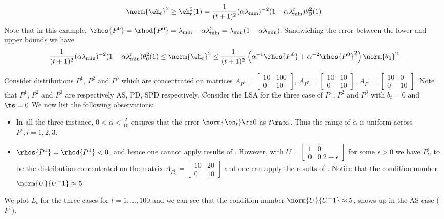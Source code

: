 \begin{align*}
\norm{\eh_t}^2\geq \eh^2_t(1)=\frac{1}{(t+1)^2}(\alpha \lambda_{\min})^{-2}(1-\alpha \lambda_{\min}^t) \theta^2_0(1)
\end{align*}
Note that in this example, $\rhos{P^0}=\rhod{P^0}=\lambda_{\min} -\alpha \lambda_{\min}^2=\lambda_{\min}(1-\alpha \lambda_{\min})$. Sandwiching the error between the lower and upper bounds we have
\begin{align}
\frac{1}{(t+1)^2}(\alpha \lambda_{\min})^{-2}(1-\alpha \lambda_{\min}^t) \theta^2_0(1)\leq \norm{\eh_t}^2\leq
\frac{1}{(t+1)^2} \left(\alpha^{-1}\rhos{P^0}+\alpha^{-2}\rhos{P^0}^2\right)\norm{\theta_0}^2
\end{align}
\begin{example}
Consider distributions $P^1$, $P^2$ and $P^3$ which are concentrated on matrices $A_{P^1}=\begin{bmatrix} 10 &100\\ 0 &10\end{bmatrix}$, $A_{P^2}=\begin{bmatrix} 10 &10\\ 0 &10\end{bmatrix}$, $A_{P^3}=\begin{bmatrix} 10 &0 \\ 0 &10\end{bmatrix}$. Note that $P^1$, $P^2$ and $P^3$ are respectively AS, PD, SPD respectively. Consider the LSA for the three case of $P^1$, $P^2$ and $P^3$ with $b_t=0$ and $\ts=0$
We now list the following observations:
\begin{itemize}[leftmargin=*, before = \leavevmode\vspace{-\baselineskip}]
\item In all the three instance, $0<\alpha<\frac2{10}$ ensures that the error $\norm{\eh_t}\ra 0$ as $t\ra\infty$. Thus the range of $\alpha$ is uniform across $P^i,i=1,2,3$.
\item $\rhos{P^1}=\rhod{P^1}<0$, and hence one cannot apply results of . However, with  $U=\begin{bmatrix}1 &0 \\ 0 &0.2-\epsilon\end{bmatrix}$ for some $\epsilon>0$ we have $P^1_U$ to be the distribution concentrated on the matrix $A_{P^1_U}=\begin{bmatrix} 10 &20 \\ 0 &10\end{bmatrix}$ and one can apply the results of . Notice that the condition number $\norm{U}{U^-1}\approx 5$.
\end{itemize}
We plot $L_t$ for the three cases for $t=1,\ldots,100$ and we can see that the condition number $\norm{U}{U^-1}\approx 5$, shows up in the AS case ($P^1$).
\end{example}
